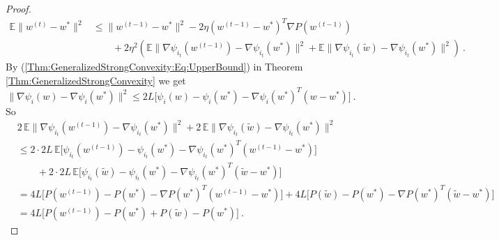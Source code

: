 \begin{proof}
\begin{equation}
\begin{array}{ll}
\mathbb{E}\|w^{(t)}-w^*\|^2
& \leq \|w^{(t-1)}-w^*\|^2 -
2\eta (w^{(t-1)}-w^*)^{T}\nabla P(w^{(t-1)})
\\
& \qquad +2\eta^2\left(\mathbb{E}\|\nabla \psi_{i_t}(w^{(t-1)})-\nabla \psi_{i_t}(w^*)\|^2 
+
\mathbb{E}\|\nabla \psi_{i_t}(\widetilde w)-\nabla \psi_{i_t}(w^*)\|^2\right) \ . 
\end{array}
\end{equation}
By (\ref{Thm:GeneralizedStrongConvexity:Eq:UpperBound}) in Theorem \ref{Thm:GeneralizedStrongConvexity} we get
$$\|\nabla \psi_i(w)-\nabla \psi_i(w^*)\|^2
\le
2L\Big[
\psi_i(w)-\psi_i(w^*)
-
\nabla \psi_i(w^*)^{T}(w-w^*)
\Big] \ .$$
So
$$\begin{array}{ll}
& 2\,\mathbb{E}\|\nabla \psi_{i_t}(w^{(t-1)})-\nabla \psi_{i_t}(w^*)\|^2
+
2\,\mathbb{E}\|\nabla \psi_{i_t}(\widetilde w)-\nabla \psi_{i_t}(w^*)\|^2
\\
& \leq 2\cdot 2L\,
\mathbb{E}
\Big[
\psi_{i_t}(w^{(t-1)})-\psi_{i_t}(w^*)
-
\nabla \psi_{i_t}(w^*)^{T}(w^{(t-1)}-w^*)
\Big]
\\
& \qquad 
+ 2\cdot 2L\,
\mathbb{E}
\Big[
\psi_{i_t}(\widetilde w)-\psi_{i_t}(w^*)
-
\nabla \psi_{i_t}(w^*)^{T}(\widetilde w-w^*)
\Big]
\\
& =
4L
\Big[
P(w^{(t-1)})-P(w^*)-\nabla P(w^*)^{T}(w^{(t-1)}-w^*)
\Big]
+ 4L
\Big[
P(\widetilde w)-P(w^*)-\nabla P(w^*)^{T}(\widetilde w-w^*)
\Big]
\\
& = 4L\Big[P(w^{(t-1)})-P(w^*)+P(\widetilde w)-P(w^*)\Big] \ .
\end{array}
$$


\end{proof}
